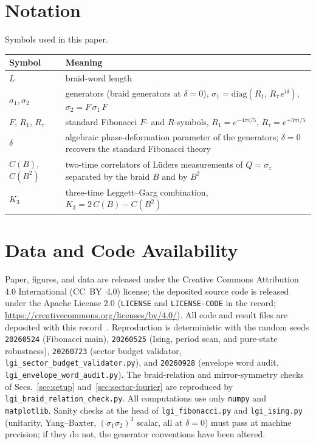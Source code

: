 \documentclass[aps,prx,reprint,amsmath,amssymb,floatfix,nofootinbib,superscriptaddress]{revtex4-2}
\begin{document}
\section*{Notation}
\noindent Symbols used in this paper.
\begin{ruledtabular}
\begin{tabular}{ll}
Symbol & Meaning \\
\hline
$L$ & \parbox[t]{0.72\columnwidth}{braid-word length} \\
$\sigma_{1},\sigma_{2}$ & \parbox[t]{0.72\columnwidth}{generators (braid generators at $\delta = 0$), $\sigma_{1} = \mathrm{diag}(R_{1},\,R_{\tau}\,e^{i\delta})$, $\sigma_{2} = F\,\sigma_{1}\,F$} \\
$F$, $R_{1}$, $R_{\tau}$ & \parbox[t]{0.72\columnwidth}{standard Fibonacci $F$- and $R$-symbols, $R_{1} = e^{-4\pi i/5}$, $R_{\tau} = e^{+3\pi i/5}$} \\
$\delta$ & \parbox[t]{0.72\columnwidth}{algebraic phase-deformation parameter of the generators; $\delta = 0$ recovers the standard Fibonacci theory} \\
$C(B)$, $C(B^{2})$ & \parbox[t]{0.72\columnwidth}{two-time correlators of L\"uders measurements of $Q = \sigma_{z}$ separated by the braid $B$ and by $B^{2}$} \\
$K_{3}$ & \parbox[t]{0.72\columnwidth}{three-time Leggett--Garg combination, $K_{3} = 2\,C(B) - C(B^{2})$} \\
\end{tabular}
\end{ruledtabular}

\section*{Data and Code Availability}

Paper, figures, and data are released under the Creative Commons
Attribution 4.0 International (CC~BY~4.0) license; the deposited source
code is released under the Apache License 2.0 (\texttt{LICENSE} and
\texttt{LICENSE-CODE} in the record;
\url{https://creativecommons.org/licenses/by/4.0/}). All code and result
files are deposited with this record~\cite{Sayim2026LGIdata}.
Reproduction is deterministic with the random seeds
\texttt{20260524} (Fibonacci main),
\texttt{20260525} (Ising, period scan, and pure-state robustness),
\texttt{20260723} (sector budget validator,
\texttt{lgi\_sector\_budget\_validator.py}), and \texttt{20260928}
(envelope word audit, \texttt{lgi\_envelope\_word\_audit.py}). The
braid-relation and mirror-symmetry checks of Secs.~\ref{sec:setup}
and~\ref{sec:sector-fourier} are reproduced by
\texttt{lgi\_braid\_relation\_check.py}. All
computations use only \texttt{numpy} and \texttt{matplotlib}.
Sanity checks at the head of \texttt{lgi\_fibonacci.py} and
\texttt{lgi\_ising.py} (unitarity, Yang--Baxter, $(\sigma_1\sigma_2)^3$
scalar, all at $\delta = 0$) must pass at machine precision; if they
do not, the generator conventions have been altered.
\end{document}
